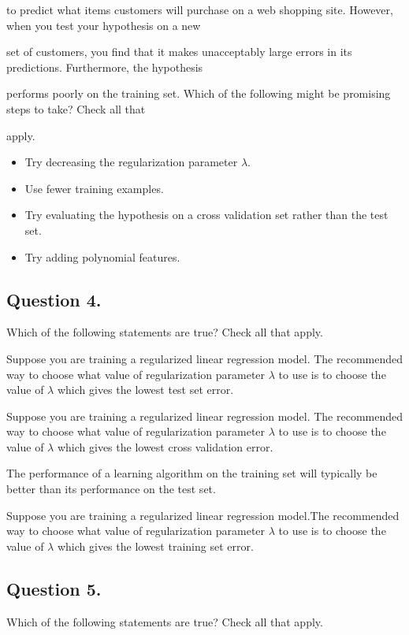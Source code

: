 \documentclass[11pt]{article} %
\begin{document}
to predict what items customers will purchase on a web shopping site. However, when you test your hypothesis on a new

set of customers, you find that it makes unacceptably large errors in its predictions. Furthermore, the hypothesis

performs poorly on the training set. Which of the following might be promising steps to take? Check all that

apply.

\begin{itemize}
\item Try decreasing the regularization parameter $\lambda$.

\item Use fewer training examples.

\item Try evaluating the hypothesis on a cross validation set rather than the test set.

\item Try adding polynomial features.
\end{itemize}
\subsection*{Question 4. }
Which of the following statements are true? Check all that apply.

Suppose you are training a regularized linear regression model. The recommended way to choose what value of regularization parameter $\lambda$ to use is to choose the value of $\lambda$ which gives the lowest test set error.

Suppose you are training a regularized linear regression model. The recommended way to choose what value of regularization parameter $\lambda$ to use is to choose the value of $\lambda$ which gives the lowest cross validation error.

The performance of a learning algorithm on the training set will typically be better than its performance on the test set.

Suppose you are training a regularized linear regression model.The recommended way to choose what value of regularization parameter $\lambda$ to use is to choose the value of $\lambda$ which gives the lowest training set error.

\subsection*{Question 5. }
Which of the following statements are true? Check all that apply.
\end{document}
